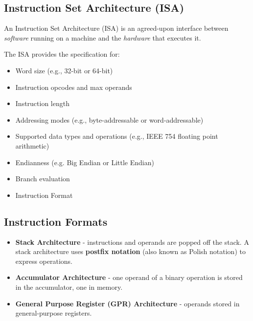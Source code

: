 \documentclass[pdftex,10pt]{article}
\begin{document}
\subsection{Instruction Set Architecture (ISA)}

An Instruction Set Architecture (ISA) is an agreed-upon interface between \textit{software} running on a machine and the \textit{hardware} that executes it.

The ISA provides the specification for:

\begin{itemize}
    \item Word size (e.g., 32-bit or 64-bit)
    \item Instruction opcodes and max operands
    \item Instruction length
    \item Addressing modes (e.g., byte-addressable or word-addressable)
    \item Supported data types and operations (e.g., IEEE 754 floating point arithmetic)
    \item Endianness (e.g. Big Endian or Little Endian)
    \item Branch evaluation
    \item Instruction Format
\end{itemize}

\subsection{Instruction Formats}

\begin{itemize}
    \item \textbf{Stack Architecture} - instructions and operands are popped off the stack. A stack architecture uses \textbf{postfix notation} (also known as Polish notation) to express operations.
    \item \textbf{Accumulator Architecture} - one operand of a binary operation is stored in the accumulator, one in memory.
    \item \textbf{General Purpose Register (GPR) Architecture} - operands stored in general-purpose registers.
\end{itemize}
\end{document}

